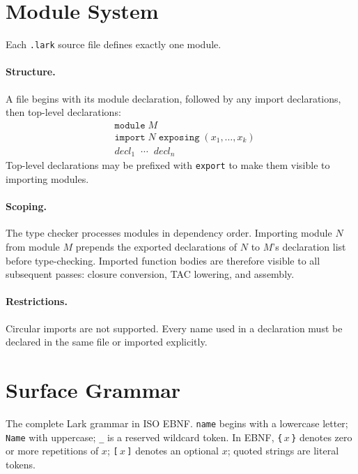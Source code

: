 \documentclass[10pt,a4paper]{article}
\theoremstyle{plain}
\theoremstyle{definition}
\theoremstyle{remark}
\begin{document}
\section{Module System}
\label{sec:modules}

Each \texttt{.lark} source file defines exactly one module.

\paragraph{Structure.}
A file begins with its module declaration, followed by any import
declarations, then top-level declarations:
\begin{align*}
&\mathtt{module}\;M \\
&\mathtt{import}\;N\;\mathtt{exposing}\;(x_1,\ldots,x_k) \\
&\textit{decl}_1\;\;\cdots\;\;\textit{decl}_n
\end{align*}
Top-level declarations may be prefixed with \texttt{export} to make them
visible to importing modules.

\paragraph{Scoping.}
The type checker processes modules in dependency order.  Importing module $N$
from module $M$ prepends the exported declarations of $N$ to $M$'s
declaration list before type-checking.  Imported function bodies are
therefore visible to all subsequent passes: closure conversion, TAC lowering,
and assembly.

\paragraph{Restrictions.}
Circular imports are not supported.  Every name used in a declaration must
be declared in the same file or imported explicitly.

\section{Surface Grammar}
\label{sec:grammar}

The complete Lark grammar in ISO EBNF\@.  \texttt{name} begins with a
lowercase letter; \texttt{Name} with uppercase; \texttt{\_} is a reserved
wildcard token.  In EBNF, \texttt{\{}\,$x$\,\texttt{\}} denotes zero or more
repetitions of $x$; \texttt{[}\,$x$\,\texttt{]} denotes an optional $x$;
quoted strings are literal tokens.
\end{document}
